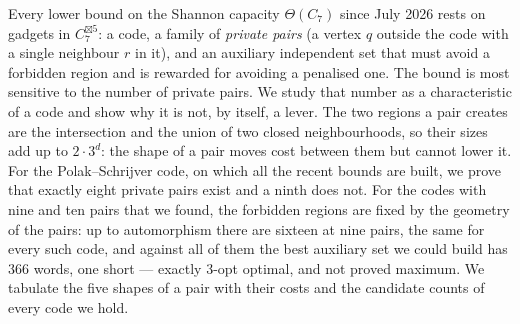 Every lower bound on the Shannon capacity $\Theta(C_7)$ since July 2026 rests on gadgets in
$C_7^{\boxtimes 5}$: a code, a family of \emph{private pairs} (a vertex $q$ outside the code with a
single neighbour $r$ in it), and an auxiliary independent set that must avoid a forbidden region and is
rewarded for avoiding a penalised one. The bound is most sensitive to the number of private pairs. We
study that number as a characteristic of a code and show why it is not, by itself, a lever. The two
regions a pair creates are the intersection and the union of two closed neighbourhoods, so their sizes
add up to $2\cdot 3^d$: the shape of a pair moves cost between them but cannot lower it. For the
Polak--Schrijver code, on which all the recent bounds are built, we prove that exactly eight private
pairs exist and a ninth does not. For the codes with nine and ten pairs that we found, the forbidden
regions are fixed by the geometry of the pairs: up to automorphism there are sixteen at nine pairs, the
same for every such code, and against all of them the best auxiliary set we could build has $366$ words,
one short --- exactly $3$-opt optimal, and not proved maximum. We tabulate the five shapes of a pair
with their costs and the candidate counts of every code we hold.
